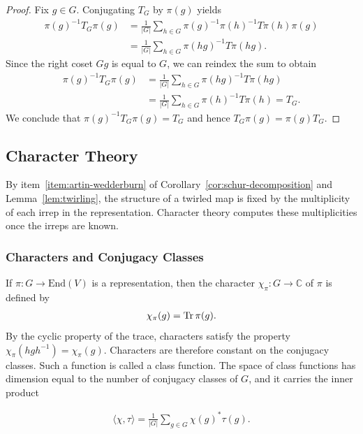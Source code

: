 \begin{proof}
    Fix $g \in G$. Conjugating $T_G$ by $\pi(g)$ yields 
    \begin{align}
        \pi(g)^{-1} T_G \pi(g) &= \frac{1}{|G|} \sum_{h \in G} \pi(g)^{-1} \pi(h)^{-1} T \pi(h) \pi(g) \nonumber \\
        &= \frac{1}{|G|} \sum_{h \in G} \pi(hg)^{-1} T \pi(hg).
    \end{align}
    Since the right coset $Gg$ is equal to $G$, we can reindex the sum to obtain 
    \begin{align}
        \pi(g)^{-1} T_G \pi(g) &= \frac{1}{|G|} \sum_{h \in G} \pi(hg)^{-1} T \pi(hg) \nonumber \\
        &= \frac{1}{|G|} \sum_{h \in G} \pi(h)^{-1} T \pi(h) = T_G.
    \end{align}
    We conclude that $\pi(g)^{-1} T_G \pi(g) = T_G$ and hence $T_G \pi(g) = \pi(g) T_G$.
\end{proof}

\subsection{Character Theory}\label{app:rep-characters}

By item~\ref{item:artin-wedderburn} of Corollary~\ref{cor:schur-decomposition} and Lemma~\ref{lem:twirling}, the structure of a twirled map is fixed by the multiplicity of each irrep in the representation.
Character theory computes these multiplicities once the irreps are known.

\subsubsection{Characters and Conjugacy Classes}

If $\pi : G \to \mathrm{End}(V)$ is a representation, then the character $\chi_\pi : G \to \mathbb{C}$ of $\pi$ is defined by 
\begin{align}
    \chi_\pi(g) = \operatorname{\mathrm{Tr}} \pi(g).
\end{align}
By the cyclic property of the trace, characters satisfy the property $\chi_\pi(h g h^{-1}) = \chi_\pi(g)$.
Characters are therefore constant on the conjugacy classes.
Such a function is called a class function.
The space of class functions has dimension equal to the number of conjugacy classes of $G$, and it carries the inner product

\begin{align}
    \langle \chi, \tau \rangle = \frac{1}{|G|} \sum_{g \in G} \chi(g)^* \tau(g).
\end{align}

